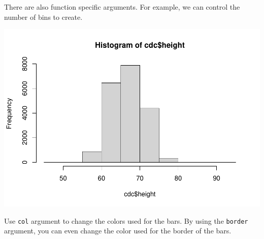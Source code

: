 \documentclass[
]{book}
\newenvironment{Shaded}{\begin{snugshade}}{\end{snugshade}}
\newcommand{\DataTypeTok}[1]{\textcolor[rgb]{0.13,0.29,0.53}{#1}}
\newcommand{\DecValTok}[1]{\textcolor[rgb]{0.00,0.00,0.81}{#1}}
\newcommand{\KeywordTok}[1]{\textcolor[rgb]{0.13,0.29,0.53}{\textbf{#1}}}
\newcommand{\NormalTok}[1]{#1}
\newcommand{\OperatorTok}[1]{\textcolor[rgb]{0.81,0.36,0.00}{\textbf{#1}}}
\newcommand{\StringTok}[1]{\textcolor[rgb]{0.31,0.60,0.02}{#1}}
\begin{document}
There are also function specific arguments. For example, we can control the number of bins to create.

\begin{Shaded}
\end{Shaded}

\includegraphics{_main_files/figure-latex/unnamed-chunk-170-1.pdf}

Use \texttt{col} argument to change the colors used for the bars. By using the \texttt{border} argument, you can even change the color used for the border of the bars.

\begin{Shaded}
\end{Shaded}
\end{document}

